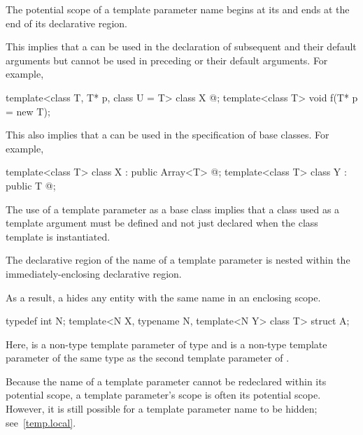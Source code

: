 \pnum
The potential scope of a template parameter name begins at its  and ends at the end of its declarative region.
\begin{note}
This implies that a  can be used in the
declaration of subsequent  and their default
arguments but cannot be used in preceding  or their
default arguments. For example,
\begin{codeblock}
template<class T, T* p, class U = T> class X { @\commentellip@ };
template<class T> void f(T* p = new T);
\end{codeblock}

This also implies that a  can be used in the
specification of base classes. For example,
\begin{codeblock}
template<class T> class X : public Array<T> { @\commentellip@ };
template<class T> class Y : public T { @\commentellip@ };
\end{codeblock}
The use of a template parameter as a base class implies that a class used as a template
argument must be defined and not just declared when the class template is instantiated.
\end{note}

\pnum
The declarative region of the name of a template parameter is nested within the
immediately-enclosing declarative region.
\begin{note}
As a result, a
 hides any entity with the same name in an enclosing
scope.
\begin{example}
\begin{codeblock}
typedef int N;
template<N X, typename N, template<N Y> class T> struct A;
\end{codeblock}
Here,  is a non-type template parameter of type  and  is a
non-type template parameter of the same type as the second template parameter of
.
\end{example}
\end{note}

\pnum
\begin{note}
Because the name of a template parameter cannot be redeclared within its
potential scope, a template parameter's scope is often its potential
scope. However, it is still possible for a template parameter name to be hidden;
see~\ref{temp.local}.
\end{note}

